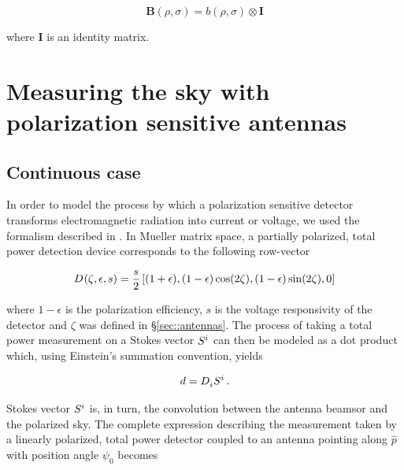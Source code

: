 \documentclass[a4paper,11pt]{article}
\begin{document}
\begin{equation}
\mathbf{B}(\rho,\sigma) = \mathit{b}(\rho,\sigma) \otimes \mathbf{I}{}
\end{equation}

\noindent
where $\mathbf{I}$ is an identity matrix. 

\section{Measuring the sky with polarization sensitive antennas}
\label{sec::convolution}
	
\subsection{Continuous case}

In order to model the process by which a polarization sensitive detector transforms electromagnetic radiation into current or voltage, we used the formalism described in \cite{2007A&A...470..771J}. In Mueller matrix space, a partially polarized, total power detection device corresponds to the following row-vector 

\begin{equation}
\begin{aligned}
\tensor{D}{}(\zeta,\epsilon,s) = \frac{s}{2} \left[(1 + \epsilon), (1 - \epsilon)\cos(2\zeta), (1 - \epsilon)\sin(2\zeta), 0 \right]
\end{aligned}
\label{eq::M_pol}
\end{equation}

\noindent
where $1 - \epsilon$ is the polarization efficiency, $s$ is the voltage responsivity of the detector and $\zeta$ was defined in \S\ref{sec::antennas}. The process of taking a total power measurement on a Stokes vector $\tensor{S}{^{i}}$ can then be modeled as a dot product which, using Einstein's summation convention, yields

\begin{equation}
\begin{aligned}
d = \tensor{D}{_{i}} \tensor{S}{^{i}} \, .
\end{aligned}
\label{eq::total_power_measurement}
\end{equation}

Stokes vector $\tensor{S}{^{i}}$ is, in turn, the convolution between the antenna beamsor and the polarized sky. The complete expression describing the measurement taken by a linearly polarized, total power detector coupled to an antenna pointing along $\hat{p}$ with position angle $\psi_0$ becomes
\end{document}

